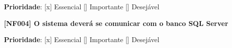 \textbf{Prioridade}:      [x] Essencial        [] Importante     [] Desejável 





\textbf{[NF004] O sistema deverá se comunicar com o banco SQL Server}

\textbf{Prioridade}:      [x] Essencial        [] Importante     [] Desejável 

